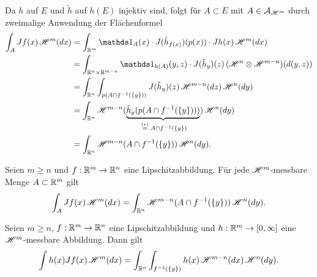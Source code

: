 \documentclass[a4paper,twoside,DIV15,BCOR12mm]{scrbook}
\newcommand{\A}{\mathcal A}
\newcommand{\ind}{\mathds 1}
\newcommand{\HM}{\H}
\begin{document}
\begin{beweis}
Da $h$ auf $E$ und $\tilde h$ auf $h(E)$ injektiv sind, folgt für $A\subset E$ mit $A\in\A_{\HM^m}$ durch zweimalige Anwendung der Flächenformel
\begin{align*}
\int_A Jf(x) \, \HM^m(dx) 
&= \int_{\MdR^m} \ind_A(x) \cdot J(\tilde h_{f(x)})(p(x)) \cdot J h(x)\, \HM^m(dx) \\
&= \int_{\MdR^n\times\MdR^{m-n}} \ind_{h(A)} (y,z) \cdot J(\tilde h_y)(z) \, (\HM^n\otimes \HM^{m-n})(d(y,z)) \\
&= \int_{\MdR^n} \int_{p(A\cap f^{-1}(\{y\}))} J(\tilde h_y)(z) \, \HM^{m-n}(dz)\, \HM^n(dy) \\
&= \int_{\MdR^n} \HM^{m-n}(\underbrace{\tilde h_y (p(A\cap f^{-1}(\{y\})))}_{\gleichwegen{(*)} A\cap f^{-1}(\{y\})}) \, \HM^n(dy) \\
&= \int_{\MdR^n} \HM^{m-n}(A\cap f^{-1}(\{y\}))\, \HM^n(dy).
\end{align*}
\end{beweis}

\begin{satz}
\label{satz:3.16}
Seien $m\ge n$ und $f:\mathbb{R}^m \to \mathbb{R}^n$ eine Lipschitzabbildung. Für jede $\HM^m$-messbare Menge $A\subset\mathbb{R}^m$ gilt 
\[
\int_A Jf(x) \,\HM^m(dx) = \int_{\MdR^n} \HM^{m-n} ( A\cap f^{-1}(\{y\})) \, \HM^n(dy).
\]
\end{satz}

\begin{korollar}
\label{kor:3.17}
Seien $m\ge n$, $f:\mathbb{R}^m \to \mathbb{R}^n$ eine Lipschitzabbildung und $h:\mathbb{R}^m\to [0,\infty]$ eine $\HM^m$-messbare Abbildung. Dann gilt
\[
\int h(x) Jf(x) \, \HM^m(dx) =
\int_{\MdR^n} \int_{f^{-1}(\{y\})} h(x) \, \HM^{m-n}(dx) \, \HM^n(dy).
\]
\end{korollar}
\end{document}
